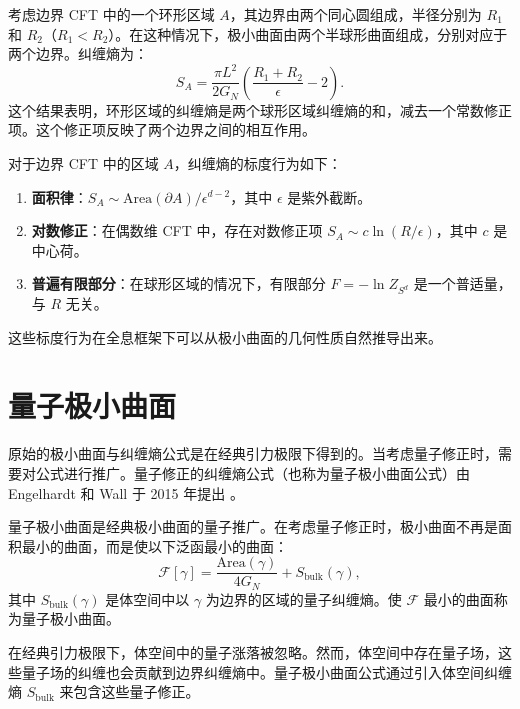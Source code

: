 \begin{example}[环形区域的纠缠熵]
考虑边界 CFT 中的一个环形区域 $A$，其边界由两个同心圆组成，半径分别为 $R_1$ 和 $R_2$（$R_1 < R_2$）。在这种情况下，极小曲面由两个半球形曲面组成，分别对应于两个边界。纠缠熵为：
\begin{equation}
    S_A = \frac{\pi L^2}{2G_N} \left( \frac{R_1 + R_2}{\epsilon} - 2 \right).
\end{equation}
这个结果表明，环形区域的纠缠熵是两个球形区域纠缠熵的和，减去一个常数修正项。这个修正项反映了两个边界之间的相互作用。
\end{example}

\begin{property}[纠缠熵的标度行为]
对于边界 CFT 中的区域 $A$，纠缠熵的标度行为如下：
\begin{enumerate}
    \item \textbf{面积律}：$S_A \sim \text{Area}(\partial A)/\epsilon^{d-2}$，其中 $\epsilon$ 是紫外截断。
    \item \textbf{对数修正}：在偶数维 CFT 中，存在对数修正项 $S_A \sim c \ln(R/\epsilon)$，其中 $c$ 是中心荷。
    \item \textbf{普遍有限部分}：在球形区域的情况下，有限部分 $F = -\ln Z_{S^d}$ 是一个普适量，与 $R$ 无关。
\end{enumerate}
这些标度行为在全息框架下可以从极小曲面的几何性质自然推导出来。
\end{property}

\section{量子极小曲面}

原始的极小曲面与纠缠熵公式是在经典引力极限下得到的。当考虑量子修正时，需要对公式进行推广。量子修正的纠缠熵公式（也称为量子极小曲面公式）由 Engelhardt 和 Wall 于 2015 年提出 \cite{Engelhardt2015}。

\begin{definition}[量子极小曲面]
量子极小曲面是经典极小曲面的量子推广。在考虑量子修正时，极小曲面不再是面积最小的曲面，而是使以下泛函最小的曲面：
\begin{equation}
    \mathcal{F}[\gamma] = \frac{\text{Area}(\gamma)}{4G_N} + S_{\text{bulk}}(\gamma),
\end{equation}
其中 $S_{\text{bulk}}(\gamma)$ 是体空间中以 $\gamma$ 为边界的区域的量子纠缠熵。使 $\mathcal{F}$ 最小的曲面称为量子极小曲面。
\end{definition}

\begin{remark}[量子修正的物理来源]
在经典引力极限下，体空间中的量子涨落被忽略。然而，体空间中存在量子场，这些量子场的纠缠也会贡献到边界纠缠熵中。量子极小曲面公式通过引入体空间纠缠熵 $S_{\text{bulk}}$ 来包含这些量子修正。
\end{remark}

